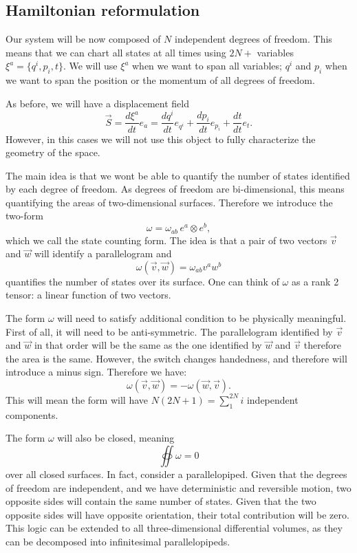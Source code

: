 \documentclass[10pt,twocolumn, nofootinbib]{revtex4-2}
\begin{document}
\subsection{Hamiltonian reformulation}

Our system will be now composed of $N$ independent degrees of freedom. This means that we can chart all states at all times using $2N + $ variables $\xi^a = \{ q^i, p_i, t\}$. We will use $\xi^a$ when we want to span all variables; $q^i$ and $p_i$ when we want to span the position or the momentum of all degrees of freedom.

As before, we will have a displacement field
\begin{equation}
	\vec{S} = \frac{d\xi^a}{dt} e_{a} = \frac{dq^i}{dt} e_{q^i} + \frac{dp_i}{dt} e_{p_i} + \frac{dt}{dt} e_t.
\end{equation}
However, in this cases we will not use this object to fully characterize the geometry of the space.

The main idea is that we wont be able to quantify the number of states identified by each degree of freedom. As degrees of freedom are bi-dimensional, this means quantifying the areas of two-dimensional surfaces. Therefore we introduce the two-form
\begin{equation}
	\omega = \omega_{ab} \, e^a \otimes e^b,
\end{equation}
which we call the state counting form. The idea is that a pair of two vectors $\vec{v}$ and $\vec{w}$ will identify a parallelogram and 
\begin{equation}
	\omega(\vec{v}, \vec{w}) = \omega_{ab} v^a w^b
\end{equation}
quantifies the number of states over its surface. One can think of $\omega$ as a rank 2 tensor: a linear function of two vectors.

The form $\omega$ will need to satisfy additional condition to be physically meaningful. First of all, it will need to be anti-symmetric. The parallelogram identified by $\vec{v}$ and $\vec{w}$ in that order will be the same as the one identified by $\vec{w}$ and $\vec{v}$ therefore the area is the same. However, the switch changes handedness, and therefore will introduce a minus sign. Therefore we have:
\begin{equation}
	\omega(\vec{v}, \vec{w}) = - \omega(\vec{w}, \vec{v}).
\end{equation}
This will mean the form will have $N(2N+1) = \sum_1^{2N}i$ independent components.

The form $\omega$ will also be closed, meaning
\begin{equation}\label{mdof_closed_form}
	\oiint \omega = 0
\end{equation}
over all closed surfaces. In fact, consider a parallelopiped. Given that the degrees of freedom are independent, and we have deterministic and reversible motion, two opposite sides will contain the same number of states. Given that the two opposite sides will have opposite orientation, their total contribution will be zero. This logic can be extended to all three-dimensional differential volumes, as they can be decomposed into infinitesimal parallelopipeds.
\end{document}
